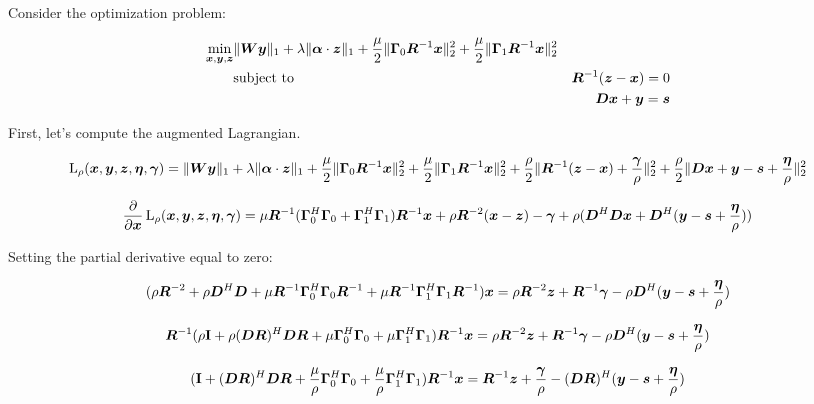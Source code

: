 \documentclass{article}
\begin{document}
Consider the optimization problem:

\begin{equation}
\begin{aligned}
\min_{\bm{x},\bm{y},\bm{z}} & \|\bm{W}\bm{y}\|_1 + \lambda\|\bm{\alpha} \cdot \bm{z}\|_1 + \frac{\mu}{2}\|\bm{\Gamma}_0\bm{R}^{-1}\bm{x}\|_2^2 + \frac{\mu}{2} \|\bm{\Gamma}_1\bm{R}^{-1}\bm{x}\|_2^2 \\
& \text{subject to } & \bm{R}^{-1}(\bm{z} - \bm{x}) = 0 \\
  &                  & \bm{D}\bm{x} + \bm{y} = \bm{s}
\end{aligned}
\end{equation}

First, let's compute the augmented Lagrangian.

\begin{equation}
\operatorname{L}_{\rho}(\bm{x},\bm{y},\bm{z},\bm{\eta},\bm{\gamma}) = \|\bm{W}\bm{y}\|_1 + \lambda\|\bm{\alpha} \cdot \bm{z}\|_1 + \frac{\mu}{2}\|\bm{\Gamma}_0\bm{R}^{-1}\bm{x}\|_2^2 + \frac{\mu}{2} \|\bm{\Gamma}_1\bm{R}^{-1}\bm{x}\|_2^2 + \frac{\rho}{2}\|\bm{R}^{-1}(\bm{z} - \bm{x}) + \frac{\bm{\gamma}}{\rho}\|_2^2 + \frac{\rho}{2}\|\bm{D}\bm{x} + \bm{y} - \bm{s} + \frac{\bm{\eta}}{\rho}\|_2^2
\end{equation}

\begin{equation}
\frac{\partial}{\partial \bm{x}} \operatorname{L}_{\rho}(\bm{x},\bm{y},\bm{z},\bm{\eta},\bm{\gamma}) = \mu\bm{R}^{-1}(\bm{\Gamma}_0^H\bm{\Gamma}_0 + \bm{\Gamma}_1^H\bm{\Gamma}_1)\bm{R}^{-1}\bm{x} + \rho\bm{R}^{-2}(\bm{x} - \bm{z}) - \bm{\gamma} + \rho(\bm{D}^H\bm{D}\bm{x} + \bm{D}^H(\bm{y} - \bm{s} + \frac{\bm{\eta}}{\rho}))
\end{equation}

Setting the partial derivative equal to zero:

\begin{equation}
(\rho\bm{R}^{-2} + \rho\bm{D}^H\bm{D} + \mu\bm{R}^{-1}\bm{\Gamma}_0^H\bm{\Gamma}_0\bm{R}^{-1} + \mu\bm{R}^{-1}\bm{\Gamma}_1^H\bm{\Gamma}_1\bm{R}^{-1})\bm{x} = \rho\bm{R}^{-2}\bm{z} + \bm{R}^{-1}\bm{\gamma} -\rho\bm{D}^H(\bm{y} - \bm{s} + \frac{\bm{\eta}}{\rho})
\end{equation}

\begin{equation}
\bm{R}^{-1}(\rho{\bf I} + \rho(\bm{D}\bm{R})^H\bm{D}\bm{R} + \mu\bm{\Gamma}_0^H\bm{\Gamma}_0 + \mu\bm{\Gamma}_1^H\bm{\Gamma}_1)\bm{R}^{-1}\bm{x} = \rho\bm{R}^{-2}\bm{z} + \bm{R}^{-1}\bm{\gamma} -\rho\bm{D}^H(\bm{y} - \bm{s} + \frac{\bm{\eta}}{\rho})
\end{equation}

\begin{equation}
({\bf I} + (\bm{D}\bm{R})^H\bm{D}\bm{R} + \frac{\mu}{\rho}\bm{\Gamma}_0^H\bm{\Gamma}_0 + \frac{\mu}{\rho}\bm{\Gamma}_1^H\bm{\Gamma}_1)\bm{R}^{-1}\bm{x} = \bm{R}^{-1}\bm{z} + \frac{\bm{\gamma}}{\rho} - (\bm{D}\bm{R})^H(\bm{y} - \bm{s} + \frac{\bm{\eta}}{\rho})
\end{equation}
\end{document}
